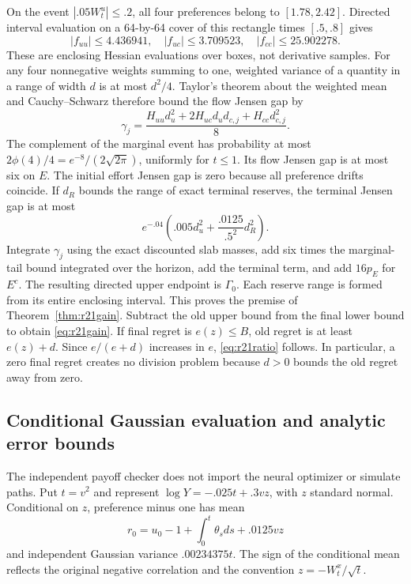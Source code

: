 On the event $|.05W^u_t|\leq.2$, all four preferences belong to $[1.78,2.42]$. Directed interval evaluation on a 64-by-64 cover of this rectangle times $[.5,.8]$ gives
\[
 |f_{uu}|\leq4.436941,\quad |f_{uc}|\leq3.709523,\quad
 |f_{cc}|\leq25.902278.
\]
These are enclosing Hessian evaluations over boxes, not derivative samples. For any four nonnegative weights summing to one, weighted variance of a quantity in a range of width $d$ is at most $d^2/4$. Taylor's theorem about the weighted mean and Cauchy--Schwarz therefore bound the flow Jensen gap by
\[
 \gamma_j=\frac{H_{uu}d_u^2+2H_{uc}d_ud_{c,j}+H_{cc}d_{c,j}^2}{8}.
\]
The complement of the marginal event has probability at most
$2\phi(4)/4=e^{-8}/(2\sqrt{2\pi})$, uniformly for $t\leq1$. Its flow Jensen gap is at most six on $E$. The initial effort Jensen gap is zero because all preference drifts coincide. If $d_R$ bounds the range of exact terminal reserves, the terminal Jensen gap is at most
\[
 e^{-.04}\left(.005d_u^2+\frac{.0125}{.5^2}d_R^2\right).
\]
Integrate $\gamma_j$ using the exact discounted slab masses, add six times the marginal-tail bound integrated over the horizon, add the terminal term, and add $16p_E$ for $E^c$. The resulting directed upper endpoint is $\Gamma_0$. Each reserve range is formed from its entire enclosing interval. This proves the premise of Theorem~\ref{thm:r21gain}. Subtract the old upper bound from the final lower bound to obtain \eqref{eq:r21gain}. If final regret is $e(z)\leq B$, old regret is at least $e(z)+d$. Since $e/(e+d)$ increases in $e$, \eqref{eq:r21ratio} follows. In particular, a zero final regret creates no division problem because $d>0$ bounds the old regret away from zero.

\subsection{Conditional Gaussian evaluation and analytic error bounds}\label{app:r21quad}
The independent payoff checker does not import the neural optimizer or simulate paths. Put $t=v^2$ and represent $\log Y=-.025t+.3vz$, with $z$ standard normal. Conditional on $z$, preference minus one has mean
\[
 r_0=u_0-1+\int_0^t\theta_sds+.0125vz
\]
and independent Gaussian variance $.00234375t$. The sign of the conditional mean reflects the original negative correlation and the convention $z=-W^x_t/\sqrt t$.

